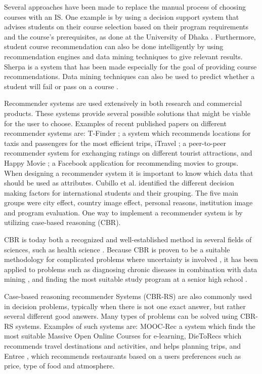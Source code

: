 Several approaches have been made to replace the manual process of choosing courses with an IS. One example is by using a decision support system that advises students on their course selection based on their program requirements and the course's prerequisites, as done at the University of Dhaka \cite{roushan2014university}. Furthermore, student course recommendation can also be done intelligently by using recommendation engines and data mining techniques to give relevant results. Sherpa \cite{bramucci2012sherpa} is a system that has been made especially for the goal of providing course recommendations. Data mining techniques can also be used to predict whether a student will fail or pass on a course \cite{vialardi2009recommendation}.

Recommender systems are used extensively in both research and commercial products. These systems provide several possible solutions that might be viable for the user to choose. Examples of recent published papers on different recommender systems are: T-Finder \cite{yuan2013t}; a system which recommends locations for taxis and passengers for the most efficient trips, iTravel \cite{yang2013itravel}; a peer-to-peer recommender system for exchanging ratings on different tourist attractions, and Happy Movie \cite{quijano2011happy}; a Facebook application for recommending movies to groups. When designing a recommender system it is important to know which data that should be used as attributes. Cubillo et al. \cite{maria2006international} identified the different decision making factors for international students and their grouping. The five main groups were city effect, country image effect, personal reasons, institution image and program evaluation. One way to implement a recommender system is by utilizing case-based reasoning (CBR).

CBR is today both a recognized and well-established method in several fields of sciences, such as health science \cite{begum2011case}. Because CBR is proven to be a suitable methodology for complicated problems where uncertainty is involved \cite{richter2013case}, it has been applied to problems such as diagnosing chronic diseases in combination with data mining \cite{huang2007integrating}, and finding the most suitable study program at a senior high school \cite{mulyana2015case}. 

Case-based reasoning recommender Systems (CBR-RS) are also commonly used in decision problems, typically when there is not one exact answer, but rather several different good answers. Many types of problems can be solved using CBR-RS systems. Examples of such systems are: MOOC-Rec \cite{bousbahi2015mooc} a system which finds the most suitable Massive Open Online Courses for e-learning, DieToRecs \cite{fesenmaier2003dietorecs} which recommends travel destinations and activities, and helps planning trips, and Entree \cite{trewin2000knowledge}, which recommends restaurants based on a users preferences such as price, type of food and atmosphere. 

